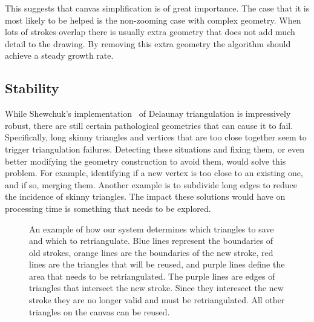 \documentclass[review]{acmsiggraph}
\begin{document}
This suggests that canvas simplification is of great importance.
The case that it is most likely to be helped is the non-zooming case with complex geometry. When lots of strokes
overlap there is usually extra geometry that does not add much detail to the drawing. By removing
this extra geometry the algorithm should achieve a steady growth rate.

\subsection{Stability} 

While Shewchuk's implementation~ of Delaunay triangulation is impressively robust, there are still certain pathological geometries that can cause it to fail.  Specifically, long skinny triangles and vertices that are too close together seem to trigger triangulation failures.  Detecting these situations and fixing them, or even better modifying the geometry construction to avoid them, would solve this problem.  For example, identifying if a new vertex is too close to an existing one, and if so, merging them.  Another example is to subdivide long edges to reduce the incidence of skinny triangles.  The impact these solutions would have on processing time is something that needs to be explored.

\begin{figure}
    \centering
    \caption{An example of how our system determines which triangles to save and which to retriangulate. Blue
    lines represent the boundaries of old strokes, orange lines are the boundaries of the new stroke, red lines are
    the triangles that will be reused, and purple lines define the area that needs to be retriangulated. The purple
    lines are edges of triangles that intersect the new stroke. Since they interesect the new stroke they are no
    longer valid and must be retriangulated. All other triangles on the canvas can be reused.}
    \label{fig:modified}
\end{figure}
\end{document}
